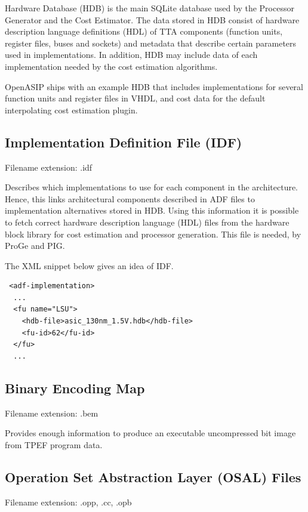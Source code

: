 \documentclass[a4paper,twoside]{tceusermanual}
\begin{document}
Hardware Database (HDB) is the main SQLite database used by the
Processor Generator and the Cost Estimator.  The data stored in HDB consist
of hardware description language definitions (HDL) of TTA components
(function units, register files, buses and sockets) and metadata that
describe certain parameters used in implementations. In addition, HDB may
include data of each implementation needed by the cost estimation
algorithms.

OpenASIP ships with an example HDB that includes implementations for several
function units and register files in VHDL, and cost data for the default
interpolating cost estimation plugin. 

\subsection{Implementation Definition File (IDF)}
\label{sec:idf}

Filename extension:  .idf

Describes which implementations to use for each component in the
architecture. Hence, this links architectural components described in 
ADF files to implementation alternatives stored in HDB. Using this
information it is possible to fetch correct hardware description
language (HDL) files from the hardware block library for cost
estimation and processor generation. This file is needed, by
ProGe and PIG.


The XML snippet below gives an idea of IDF.
\begin{verbatim}
 <adf-implementation>
  ...
  <fu name="LSU">
    <hdb-file>asic_130nm_1.5V.hdb</hdb-file>
    <fu-id>62</fu-id>
  </fu>
  ...
\end{verbatim}



\subsection{Binary Encoding Map}
\label{sec:bem}

Filename extension: .bem 

Provides enough information to produce an executable uncompressed bit
image 
from TPEF program data.


\subsection{Operation Set Abstraction Layer (OSAL) Files}
\label{section:osal}
Filename extension: .opp, .cc, .opb
\end{document}
